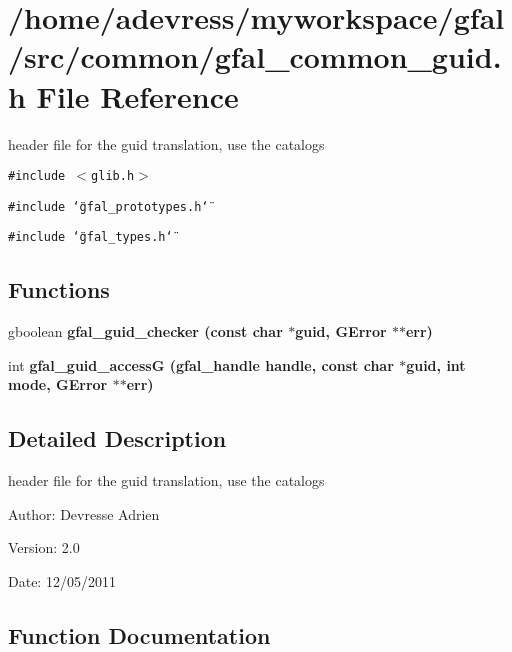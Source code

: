 \section{/home/adevress/myworkspace/gfal/src/common/gfal\_\-common\_\-guid.h File Reference}
\label{gfal__common__guid_8h}
header file for the guid translation, use the catalogs 

{\tt \#include $<$glib.h$>$}\par
{\tt \#include \char`\"{}gfal\_\-prototypes.h\char`\"{}}\par
{\tt \#include \char`\"{}gfal\_\-types.h\char`\"{}}\par
\subsection*{Functions}
\begin{CompactItemize}
\item 
gboolean \bf{gfal\_\-guid\_\-checker} (const char $\ast$guid, GError $\ast$$\ast$err)
\item 
int \bf{gfal\_\-guid\_\-access\-G} (gfal\_\-handle handle, const char $\ast$guid, int mode, GError $\ast$$\ast$err)
\end{CompactItemize}


\subsection{Detailed Description}
header file for the guid translation, use the catalogs 

\begin{Desc}
\item[Author:]Devresse Adrien \end{Desc}
\begin{Desc}
\item[Version:]2.0 \end{Desc}
\begin{Desc}
\item[Date:]12/05/2011 \end{Desc}


\subsection{Function Documentation}

